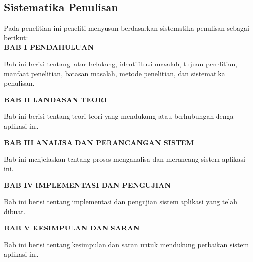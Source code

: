 \subsection{Sistematika Penulisan}
Pada penelitian ini peneliti menyusun berdasarkan sistematika penulisan sebagai berikut: \\
\noindent \textbf{BAB I \hspace{1cm} PENDAHULUAN}
\begin{addmargin}[2.35cm]{0em}
Bab ini berisi tentang latar belakang, identifikasi masalah, tujuan penelitian, manfaat penelitian, batasan masalah, metode penelitian, dan sistematika penulisan.
\end{addmargin}
\noindent \textbf{BAB II \hspace{0.8cm} LANDASAN TEORI}
\begin{addmargin}[2.35cm]{0em}
Bab ini berisi tentang teori-teori yang mendukung atau berhubungan denga aplikasi ini.
\end{addmargin}
\noindent \textbf{BAB III \hspace{0.7cm} ANALISA DAN PERANCANGAN SISTEM}
\begin{addmargin}[2.35cm]{0em}
Bab ini menjelaskan tentang proses menganalisa dan merancang sistem aplikasi ini.
\end{addmargin}
\noindent \textbf{BAB IV \hspace{0.7cm} IMPLEMENTASI DAN PENGUJIAN}
\begin{addmargin}[2.35cm]{0em}
Bab ini berisi tentang implementasi dan pengujian sistem aplikasi yang telah dibuat.
\end{addmargin}
\noindent \textbf{BAB V \hspace{0.8cm} KESIMPULAN DAN SARAN}
\begin{addmargin}[2.35cm]{0em}
Bab ini berisi tentang kesimpulan dan saran untuk mendukung perbaikan sistem aplikasi ini.
\end{addmargin}

\newpage